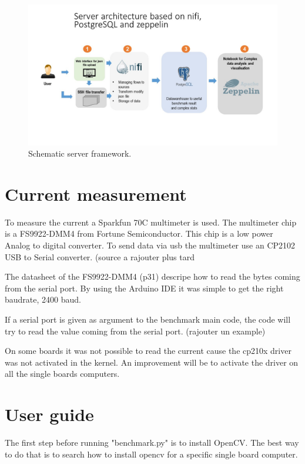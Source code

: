 \documentclass[english]{book_template} %
\begin{document}
\begin{figure}[H]
\center
\caption{Schematic server framework.\label{fig:server Arch}}
\includegraphics[scale=0.55]{./img/serverArch.jpg}
\end{figure} 

\section{Current measurement}

To measure the current a Sparkfun 70C multimeter is used. The multimeter chip is a FS9922-DMM4 from Fortune Semiconductor. This chip is a low power Analog to digital converter.   To send data via usb the multimeter use an CP2102 USB to Serial converter. (source a rajouter plus tard %

The datasheet of the FS9922-DMM4 (p31) descripe how to read the bytes coming from the serial port. By using the Arduino IDE it was simple to get the right baudrate, 2400 baud. 

If a serial port is given as argument to the benchmark main code, the code will try to read the value coming from the serial port. (rajouter un example) 

On some boards it was not possible to read the current cause the cp210x driver was not activated in the kernel. An improvement will be to activate the driver on all the single boards computers.
\section{User guide}


The first step before running "benchmark.py" is to install OpenCV. The best way to do that is to search how to install opencv for a specific single board computer.
\end{document}

